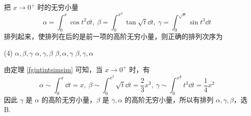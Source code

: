 \begin{example}
    把 $x\to0^+$ 时的无穷小量 $$\alpha=\int_{0}^{x}\cos t^2\dd t,~\beta=\int_{0}^{x^2}\tan\sqrt{t}\dd t,~\gamma=\int_{0}^{\sqrt{x}}\sin t^3\dd t$$
    排列起来，使排列在后的是前一项的高阶无穷小量，则正确的排列次序为
    \begin{tasks}(4)
        \task $\alpha,\beta,\gamma$
        \task $\alpha,\gamma,\beta$
        \task $\beta,\alpha,\gamma$
        \task $\beta,\gamma,\alpha$
    \end{tasks}
\end{example}
\begin{solution}
    由定理 \ref{fgintintsimsim} 可知，当 $x\to0^+$ 时，有
    $$\alpha\sim\int_{0}^{x}\dd t=x,~\beta \sim\int_{0}^{x^2}\sqrt{t}\dd t=\dfrac{2}{3}x^3,~\gamma\sim\int_{0}^{x^{\frac{1}{2}}}t^3\dd t=\dfrac{1}{4}x^2$$
    因此 $\gamma$ 是 $\alpha$ 的高阶无穷小量，$\beta $ 是 $\gamma,\alpha$ 的高阶无穷小量，所以有排列 $\alpha,\gamma,\beta$，选 B.
\end{solution}

